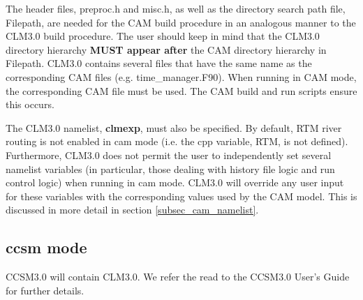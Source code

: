 The header files, preproc.h and misc.h, as well as the directory
search path file, Filepath, are needed for the CAM build procedure in
an analogous manner to the CLM3.0 build procedure.  The user should
keep in mind that the CLM3.0 directory hierarchy {\bf MUST appear
after} the CAM directory hierarchy in Filepath. CLM3.0 contains
several files that have the same name as the corresponding CAM files
(e.g. time\_manager.F90). When running in CAM mode, the corresponding
CAM file must be used. The CAM build and run scripts ensure this
occurs.

The CLM3.0 namelist, {\bf clmexp}, must also be specified.  By
default, RTM river routing is not enabled in cam mode (i.e. the cpp
variable, RTM, is not defined). Furthermore, CLM3.0 does not permit
the user to independently set several namelist variables (in
particular, those dealing with history file logic and run control
logic) when running in cam mode. CLM3.0 will override any user input
for these variables with the corresponding values used by the CAM
model. This is discussed in more detail in section
\ref{subsec_cam_namelist}.

\subsection {ccsm mode}

CCSM3.0 will contain CLM3.0. We refer the read to the CCSM3.0 User's Guide
for further details.

